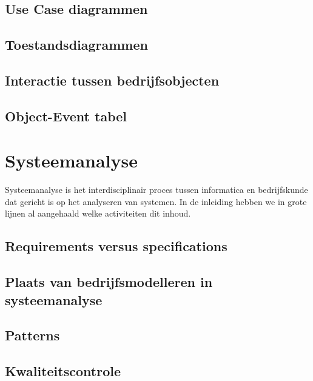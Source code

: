 \documentclass[oneside,11pt]{book}
\begin{document}
\section{Use Case diagrammen}


\section{Toestandsdiagrammen}


\section{Interactie tussen bedrijfsobjecten}


\section{Object-Event tabel}


\chapter{Systeemanalyse}
Systeemanalyse is het interdisciplinair proces tussen informatica en bedrijfskunde dat gericht is op het analyseren van systemen. In de inleiding hebben we in grote lijnen al aangehaald welke activiteiten dit inhoud.

\section{Requirements versus specifications}


\section{Plaats van bedrijfsmodelleren in systeemanalyse}


\section{Patterns}



\section{Kwaliteitscontrole}


\backmatter
\printindex
\end{document}
